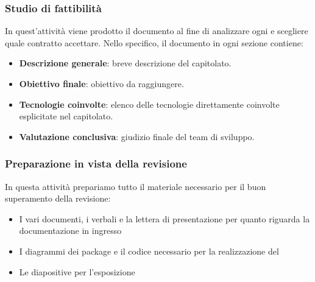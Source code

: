         \subsubsection{Studio di fattibilità}\label{PP:Fornitura:SdF}
        In quest'attività viene prodotto il documento \Doc{\SdFv} al fine di analizzare ogni  e scegliere quale contratto accettare.
        Nello specifico, il documento in ogni sezione contiene:
        	\begin{itemize}
        		\item \textbf{Descrizione generale}: breve descrizione del capitolato.
        		\item \textbf{Obiettivo finale}: obiettivo da raggiungere.
        		\item \textbf{Tecnologie coinvolte}: elenco delle tecnologie direttamente coinvolte esplicitate nel capitolato.
        		\item \textbf{Valutazione conclusiva}: giudizio finale del team di sviluppo.
        	\end{itemize}

        \subsubsection{Preparazione in vista della revisione}
		In questa attività prepariamo tutto il materiale necessario per il buon superamento della revisione:
		\begin{itemize}
			\item I vari documenti, i verbali e la lettera di presentazione per quanto riguarda la documentazione in ingresso
			\item I diagrammi dei package e il codice necessario per la realizzazione del 
			\item Le diapositive per l'esposizione
		\end{itemize}


